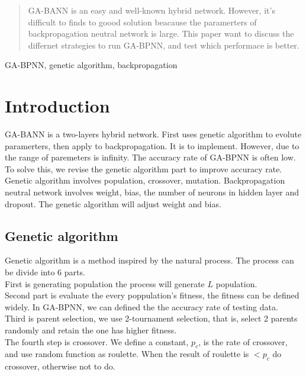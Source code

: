\documentclass[conference]{IEEEtran}
\begin{document}
\begin{abstract}
GA-BANN is an easy and well-known hybrid network. However, it's difficult to finds to goood solution beacause the paramerters of backpropagation neutral network is large. This paper want to discuss the differnet strategies to run GA-BPNN, and test which performace is better. 
\end{abstract}

\begin{IEEEkeywords}
GA-BPNN, genetic algorithm, backpropagation
\end{IEEEkeywords}

\section{Introduction}
GA-BANN is a two-layers hybrid network. First uses genetic algorithm to evolute paramerters, then apply to backpropagation. It is to implement. However, due to the range of paremeters is infinity. The accuracy rate of GA-BPNN is often low. To solve this, we revise the genetic algorithm part to improve accuracy rate.\\

Genetic algorithm involves population, crossover, mutation. Backpropagation neutral network involves weight, bias, the number of neurons in hidden layer and dropout. The genetic algorithm will adjust weight and bias.\\ 

\subsection{Genetic algorithm}
Genetic algorithm is a method inspired by the natural process. The process can be divide into 6 parts.\\

First is generating population the process will generate $L$ population.\\

Second part is evaluate the every poppulation's fitness, the fitness can be defined widely. In GA-BPNN, we can defined the the accuracy rate of testing data.\\

Third is parent selection, we use 2-tournament selection, that is, select 2 parents randomly and retain the one has higher fitness.\\

The fourth step is crossover. We define a constant, $p_c$, is the rate of crossover, and use random function as roulette. When the result of roulette is $< p_c$ do crossover, otherwise not to do.\\
\end{document}
